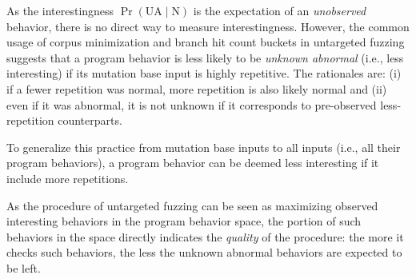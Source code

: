 \documentclass[letterpaper,twocolumn,10pt]{article}
\begin{document}
%
As the interestingness $\Pr(\mathrm{UA} \mid \mathrm{N})$ is the expectation of
an \emph{unobserved} behavior, there is no direct way to measure
interestingness. 
%
However, the common usage of corpus minimization
\cite{libfuzzer,efffuzz,herrera2021seedsel,herrera2021seedsel} and branch hit
count buckets \cite{afl,libfuzzer} in untargeted fuzzing suggests that a program behavior
is less likely to be \emph{unknown abnormal} (i.e., less interesting) if its
mutation base input is highly repetitive.
%
The rationales are: (i) if a fewer repetition was normal,
more repetition is also likely normal and (ii) even if it was abnormal, it is 
not unknown if it corresponds to pre-observed less-repetition counterparts. 

To generalize this practice from mutation base inputs to all inputs (i.e., all
their program behaviors), a program behavior can be deemed less interesting if
it include more repetitions.

%
%




%
As the procedure of untargeted fuzzing can be seen as maximizing observed
interesting behaviors in the program behavior space, the portion of such 
behaviors in the space directly indicates the \emph{quality} of the
procedure: the more it checks such behaviors, the less the unknown
abnormal behaviors are expected to be left.
\end{document}
